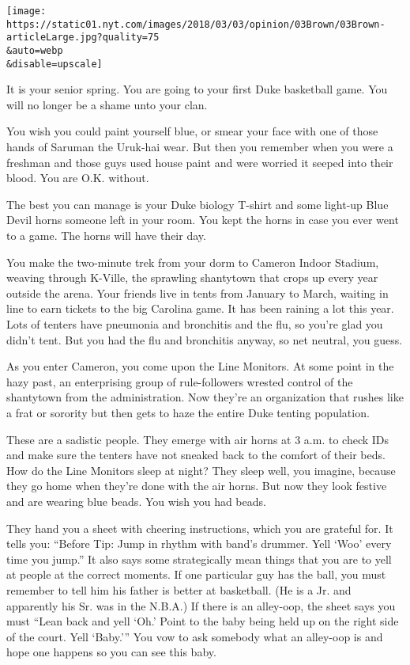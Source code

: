 \texttt{[image: https://static01.nyt.com/images/2018/03/03/opinion/03Brown/03Brown-articleLarge.jpg?quality=75\\\&auto=webp\\\&disable=upscale]}

It is your senior spring. You are going to your first Duke basketball
game. You will no longer be a shame unto your clan.

You wish you could paint yourself blue, or smear your face with one of
those hands of Saruman the Uruk-hai wear. But then you remember when you
were a freshman and those guys used house paint and were worried it
seeped into their blood. You are O.K. without.

The best you can manage is your Duke biology T-shirt and some light-up
Blue Devil horns someone left in your room. You kept the horns in case
you ever went to a game. The horns will have their day.

You make the two-minute trek from your dorm to Cameron Indoor Stadium,
weaving through K-Ville, the sprawling shantytown that crops up every
year outside the arena. Your friends live in tents from January to
March, waiting in line to earn tickets to the big Carolina game. It has
been raining a lot this year. Lots of tenters have pneumonia and
bronchitis and the flu, so you're glad you didn't tent. But you had the
flu and bronchitis anyway, so net neutral, you guess.

As you enter Cameron, you come upon the Line Monitors. At some point in
the hazy past, an enterprising group of rule-followers wrested control
of the shantytown from the administration. Now they're an organization
that rushes like a frat or sorority but then gets to haze the entire
Duke tenting population.

These are a sadistic people. They emerge with air horns at 3 a.m. to
check IDs and make sure the tenters have not sneaked back to the comfort
of their beds. How do the Line Monitors sleep at night? They sleep well,
you imagine, because they go home when they're done with the air horns.
But now they look festive and are wearing blue beads. You wish you had
beads.

They hand you a sheet with cheering instructions, which you are grateful
for. It tells you: ``Before Tip: Jump in rhythm with band's drummer.
Yell `Woo' every time you jump.'' It also says some strategically mean
things that you are to yell at people at the correct moments. If one
particular guy has the ball, you must remember to tell him his father is
better at basketball. (He is a Jr. and apparently his Sr. was in the
N.B.A.) If there is an alley-oop, the sheet says you must ``Lean back
and yell `Oh.' Point to the baby being held up on the right side of the
court. Yell `Baby.''' You vow to ask somebody what an alley-oop is and
hope one happens so you can see this baby.

